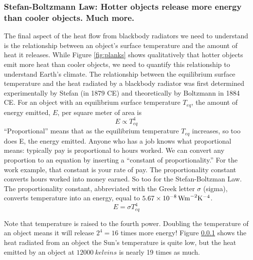 \subsubsection{Stefan-Boltzmann Law: Hotter objects release more energy than cooler objects. Much more.}
The final aspect of the heat flow from blackbody radiators we need to understand is the relationship between an object's surface temperature and the amount of heat it releases. While Figure \ref{fig:planks} shows qualitatively that hotter objects emit more heat than cooler objects, we need to quantify this relationship to understand Earth's climate. The relationship between the equilibrium surface temperature and the heat radiated by a blackbody radiator was first determined experimentally by Stefan (in 1879 CE) and theoretically by Boltzmann in 1884 CE. For an object with an equilibrium surface temperature $T_{eq}$, the amount of energy emitted, $E$, per square meter of area is
\begin{equation}
	E\propto T^4_{eq}
\end{equation}
``Proportional'' means that as the equilibrium temperature $T_{eq}$ increases, so too does E, the energy emitted. Anyone who has a job knows what proportional means: typically pay is proportional to hours worked. We can convert any proportion to an equation by inserting a ``constant of proportionality.'' For the work example, that constant is your rate of pay. The proportionality constant converts hours worked into money earned. So too for the Stefan-Boltzman Law. The proportionality constant, abbreviated with the Greek letter $\sigma$ (sigma), converts temperature into an energy, equal to $\SI{5.67d-8}{\watt\meter^{-2}\kelvin^{-4}}$.
\begin{equation}
	E=\sigma T^4_{eq}
\end{equation}

Note that temperature is raised to the fourth power. Doubling the temperature of an object means it will release $2^4=16$ times more energy! Figure \ref{} shows the heat radiated from an object the Sun's temperature is quite low, but the heat emitted by an object at $\SI{12000}{kelvins}$ is nearly 19 times as much. 

